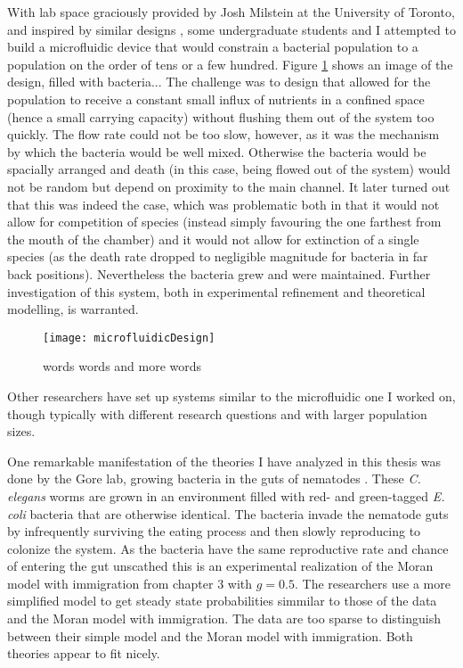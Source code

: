 With lab space graciously provided by Josh Milstein at the University of Toronto, and inspired by similar designs \cite{???}, some undergraduate students and I attempted to build a microfluidic device that would constrain a bacterial population to a population on the order of tens or a few hundred. 
Figure \ref{microfluidic} shows an image of the design, filled with bacteria... 
The challenge was to design that allowed for the population to receive a constant small influx of nutrients in a confined space (hence a small carrying capacity) without flushing them out of the system too quickly. 
The flow rate could not be too slow, however, as it was the mechanism by which the bacteria would be well mixed. 
Otherwise the bacteria would be spacially arranged and death (in this case, being flowed out of the system) would not be random but depend on proximity to the main channel. 
It later turned out that this was indeed the case, which was problematic both in that it would not allow for competition of species (instead simply favouring the one farthest from the mouth of the chamber) and it would not allow for extinction of a single species (as the death rate dropped to negligible magnitude for bacteria in far back positions). 
Nevertheless the bacteria grew and were maintained. Further investigation of this system, both in experimental refinement and theoretical modelling, is warranted. 

\begin{figure}
\centering
\texttt{[image: microfluidicDesign]}
\caption{words words and more words} \label{microfluidic} %
\end{figure}

Other researchers have set up systems similar to the microfluidic one I worked on, though typically with different research questions and with larger population sizes. 

One remarkable manifestation of the theories I have analyzed in this thesis was done by the Gore lab, growing bacteria in the guts of nematodes \cite{Gore???}. 
These \emph{C. elegans} worms are grown in an environment filled with red- and green-tagged \emph{E. coli} bacteria that are otherwise identical. %
The bacteria invade the nematode guts by infrequently surviving the eating process and then slowly reproducing to colonize the system. 
As the bacteria have the same reproductive rate and chance of entering the gut unscathed this is an experimental realization of the Moran model with immigration from chapter 3 with $g=0.5$. 
The researchers use a more simplified model to get steady state probabilities simmilar to those of the data and the Moran model with immigration. 
The data are too sparse to distinguish between their simple model and the Moran model with immigration. 
Both theories appear to fit nicely. 


